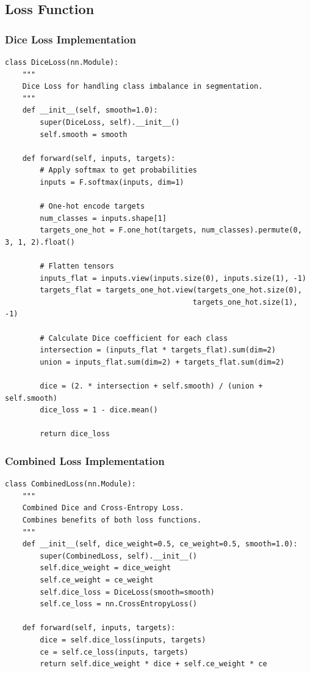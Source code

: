 \documentclass[12pt,a4paper]{article}
\begin{document}
\subsection{Loss Function}

\subsubsection{Dice Loss Implementation}
\begin{lstlisting}
class DiceLoss(nn.Module):
    """
    Dice Loss for handling class imbalance in segmentation.
    """
    def __init__(self, smooth=1.0):
        super(DiceLoss, self).__init__()
        self.smooth = smooth

    def forward(self, inputs, targets):
        # Apply softmax to get probabilities
        inputs = F.softmax(inputs, dim=1)
        
        # One-hot encode targets
        num_classes = inputs.shape[1]
        targets_one_hot = F.one_hot(targets, num_classes).permute(0, 3, 1, 2).float()
        
        # Flatten tensors
        inputs_flat = inputs.view(inputs.size(0), inputs.size(1), -1)
        targets_flat = targets_one_hot.view(targets_one_hot.size(0), 
                                           targets_one_hot.size(1), -1)
        
        # Calculate Dice coefficient for each class
        intersection = (inputs_flat * targets_flat).sum(dim=2)
        union = inputs_flat.sum(dim=2) + targets_flat.sum(dim=2)
        
        dice = (2. * intersection + self.smooth) / (union + self.smooth)
        dice_loss = 1 - dice.mean()
        
        return dice_loss
\end{lstlisting}

\subsubsection{Combined Loss Implementation}
\begin{lstlisting}
class CombinedLoss(nn.Module):
    """
    Combined Dice and Cross-Entropy Loss.
    Combines benefits of both loss functions.
    """
    def __init__(self, dice_weight=0.5, ce_weight=0.5, smooth=1.0):
        super(CombinedLoss, self).__init__()
        self.dice_weight = dice_weight
        self.ce_weight = ce_weight
        self.dice_loss = DiceLoss(smooth=smooth)
        self.ce_loss = nn.CrossEntropyLoss()

    def forward(self, inputs, targets):
        dice = self.dice_loss(inputs, targets)
        ce = self.ce_loss(inputs, targets)
        return self.dice_weight * dice + self.ce_weight * ce
\end{lstlisting}
\end{document}
